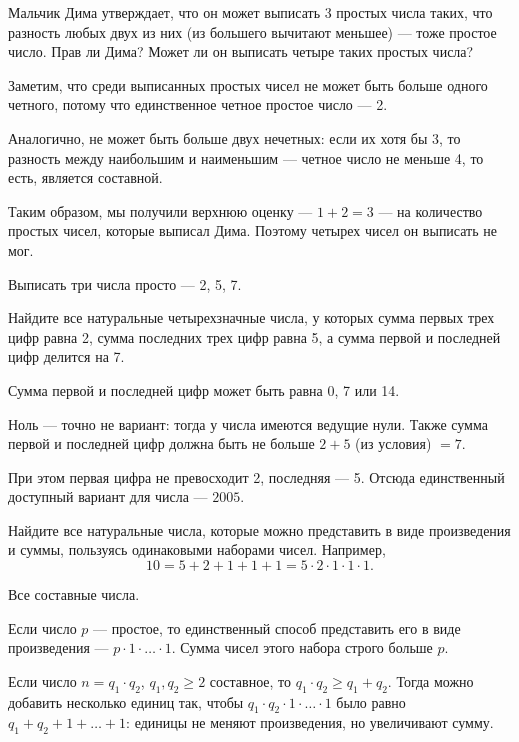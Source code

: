 ﻿


\begin{itemize}

	\itA Мальчик Дима утверждает, что он может выписать 3 простых числа таких, что разность любых двух из них (из большего вычитают меньшее) — тоже простое число. Прав ли Дима? Может ли он выписать четыре таких простых числа?
	
	\itr Заметим, что среди выписанных простых чисел не может быть больше одного четного, потому что единственное четное простое число — 2.
	
	Аналогично, не может быть больше двух нечетных: если их хотя бы 3, то разность между наибольшим и наименьшим — четное число не меньше 4, то есть, является составной.

	Таким образом, мы получили верхнюю оценку — $1+2=3$ — на количество простых чисел, которые выписал Дима. Поэтому четырех чисел он выписать не мог.
	
	Выписать три числа просто — 2, 5, 7.

	\itB Найдите все натуральные четырехзначные числа, у которых сумма первых трех цифр равна 2, сумма последних трех цифр равна 5, а сумма первой и последней цифр делится на 7.
	
	\itr Сумма первой и последней цифр может быть равна 0, 7 или 14.
	
	Ноль — точно не вариант: тогда у числа имеются ведущие нули. Также сумма первой и последней цифр должна быть не больше $2+5$ (из условия) $=7$.
	
	При этом первая цифра не превосходит 2, последняя — 5. Отсюда единственный доступный вариант для числа — $2005$.
	
	\itC Найдите все натуральные числа, которые можно представить в виде произведения и суммы, пользуясь одинаковыми наборами чисел. Например,
	$$10 = 5+2+1+1+1 = 5 \cdot 2 \cdot 1 \cdot 1 \cdot 1.$$
	
	\itr Все составные числа.
	
	Если число $p$ — простое, то единственный способ представить его в виде произведения — $p \cdot 1 \cdot \ldots \cdot 1$. Сумма чисел этого набора строго больше $p$.
	
	Если число $n = q_1 \cdot q_2$, $q_1, q_2 \ge 2$ составное, то $q_1 \cdot q_2 \ge q_1 + q_2$. Тогда можно добавить несколько единиц так, чтобы $q_1 \cdot q_2 \cdot 1 \cdot \ldots \cdot 1$ было равно $q_1 + q_2 + 1 + \ldots + 1$: единицы не меняют произведения, но увеличивают сумму.

\end{itemize}

